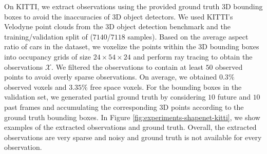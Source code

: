 %
On KITTI, we extract observations using the provided ground truth 3D bounding boxes to avoid the inaccuracies of 3D object detectors.
We used KITTI's Velodyne point clouds from the 3D object detection benchmark and the training/validation split of \cite{Chen2016ARXIV} ($7140$/$7118$ samples). Based on the average aspect ratio of cars in the dataset, we voxelize the points within the 3D bounding boxes into occupancy grids of size $24 \times 54 \times 24$ and perform ray tracing to obtain the observations $\mathcal{X}$.
We filtered the observations to contain at least $50$ observed points to avoid overly sparse observations. On average, we obtained $0.3\%$ observed voxels and $3.35\%$ free space voxels. For the bounding boxes in the validation set, we generated partial ground truth by considering $10$ future and $10$ past frames and accumulating the corresponding 3D points according to the ground truth bounding boxes. In Figure \ref{fig:experiments-shapenet-kitti}, we show  examples of the extracted observations and ground truth. Overall, the extracted observations are very sparse and noisy and ground truth is not available for every observation.

%

